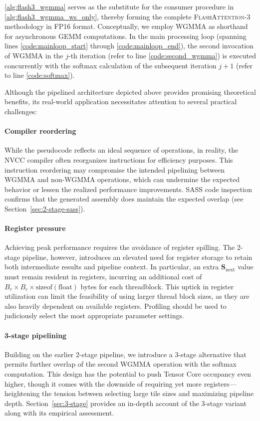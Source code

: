 \begin{algorithm}[H]
\begin{algorithmic}[1]
\cref{alg:flash3_wgmma} serves as the substitute for the consumer procedure in \cref{alg:flash3_wgmma_ws_only}, thereby forming the complete \textsc{FlashAttention-3} methodology in FP16 format. Conceptually, we employ WGMMA as shorthand for asynchronous GEMM computations. In the main processing loop (spanning lines \ref{code:mainloop_start} through \ref{code:mainloop_end}), the second invocation of WGMMA in the $j$-th iteration (refer to line \ref{code:second_wgmma}) is executed concurrently with the softmax calculation of the subsequent iteration $j+1$ (refer to line \ref{code:softmax}).

Although the pipelined architecture depicted above provides promising theoretical benefits, its real-world application necessitates attention to several practical challenges:
\paragraph{Compiler reordering} While the pseudocode reflects an ideal sequence of operations, in reality, the NVCC compiler often reorganizes instructions for efficiency purposes. This instruction reordering may compromise the intended pipelining between WGMMA and non-WGMMA operations, which can undermine the expected behavior or lessen the realized performance improvements. SASS code inspection confirms that the generated assembly does maintain the expected overlap (see Section~\ref{sec:2-stage-sass}).
\paragraph{Register pressure} Achieving peak performance requires the avoidance of register spilling. The 2-stage pipeline, however, introduces an elevated need for register storage to retain both intermediate results and pipeline context. In particular, an extra $\mathbf{S}_{\mathrm{next}}$ value must remain resident in registers, incurring an additional cost of $B_r \times B_c \times \text{sizeof}(\text{float})$ bytes for each threadblock. This uptick in register utilization can limit the feasibility of using larger thread block sizes, as they are also heavily dependent on available registers. Profiling should be used to judiciously select the most appropriate parameter settings.
\paragraph{3-stage pipelining} Building on the earlier 2-stage pipeline, we introduce a 3-stage alternative that permits further overlap of the second WGMMA operation with the softmax computation. This design has the potential to push Tensor Core occupancy even higher, though it comes with the downside of requiring yet more registers—heightening the tension between selecting large tile sizes and maximizing pipeline depth. Section~\cref{sec:3-stage} provides an in-depth account of the 3-stage variant along with its empirical assessment.


\end{algorithmic}
\end{algorithm}
